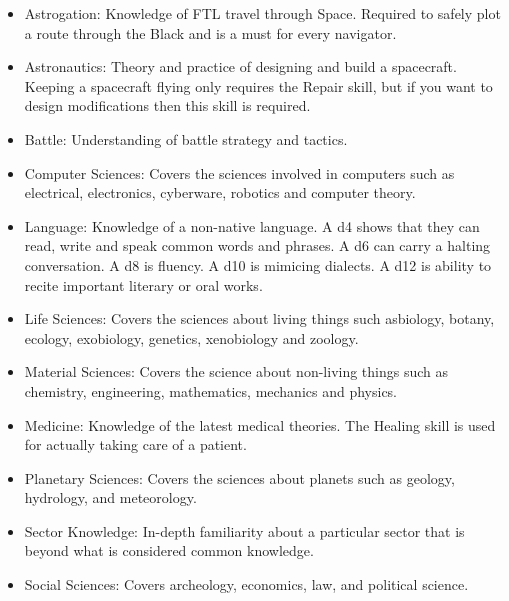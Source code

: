 \documentclass[10pt,twoside]{article}
\begin{document}
\begin{multicols}{2}
\begin{itemize}
\begin{itemize}
            \item Astrogation: Knowledge of FTL travel through Space. Required to safely plot a route through the Black and is a must for every navigator.

            \item Astronautics: Theory and practice of designing and build a spacecraft. Keeping a spacecraft flying only requires the Repair skill, but if you want to design modifications then this skill is required.

            \item Battle: Understanding of battle strategy and tactics.

            \item Computer Sciences: Covers the sciences involved in computers such as electrical, electronics, cyberware, robotics and computer theory.

            \item Language: Knowledge of a non-native language. A d4 shows that they can read, write and speak common words and phrases. A d6 can carry a halting conversation. A d8 is fluency. A d10 is mimicing dialects. A d12 is ability to recite important literary or oral works.

            \item Life Sciences: Covers the sciences about living things such asbiology, botany, ecology, exobiology, genetics, xenobiology and zoology.

            \item Material Sciences: Covers the science about non-living things such as chemistry, engineering, mathematics, mechanics and physics.

            \item Medicine: Knowledge of the latest medical theories. The Healing skill is used for actually taking care of a patient.

            \item Planetary Sciences: Covers the sciences about planets such as geology, hydrology, and meteorology.

            \item Sector Knowledge: In-depth familiarity about a particular sector that is beyond what is considered common knowledge.

            \item Social Sciences: Covers archeology, economics, law, and political science.

            \end{itemize}


\end{itemize}
\end{multicols}
\end{document}
